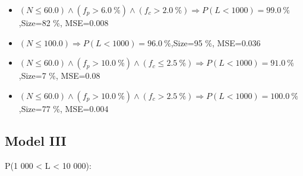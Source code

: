 \documentclass[numbered]{CSL}
\begin{document}
\begin{itemize}
\item $(N \leq 60.0) \land (f_p > 6.0~\%) \land (f_c > 2.0~\%) \Rightarrow P(L < 1 000) = 99.0~\%$,\hfill Size=82 \%, MSE=0.008
\item $(N \leq 100.0) \Rightarrow P(L < 1 000) = 96.0~\%$,\hfill Size=95 \%, MSE=0.036
\item $(N \leq 60.0) \land (f_p > 10.0~\%) \land (f_c \leq 2.5~\%) \Rightarrow P(L < 1 000) = 91.0~\%$,\hfill Size=7 \%, MSE=0.08
\item $(N \leq 60.0) \land (f_p > 10.0~\%) \land (f_c > 2.5~\%) \Rightarrow P(L < 1 000) = 100.0~\%$,\hfill Size=77 \%, MSE=0.004
\end{itemize}

\subsection{Model III}
P(1 000 < L < 10 000):
\end{document}

